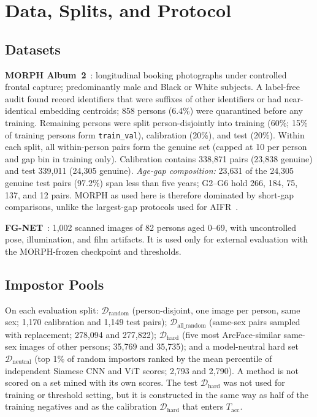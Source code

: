 \documentclass[journal]{IEEEtran}
\begin{document}


\section{Data, Splits, and Protocol}
\label{sec:protocol}

\subsection{Datasets}
\textbf{MORPH Album~2}~\cite{ricanek2006morph}: longitudinal booking photographs under controlled frontal capture; predominantly male and Black or White subjects. A label-free audit found record identifiers that were suffixes of other identifiers or had near-identical embedding centroids; 858 persons (6.4\%) were quarantined before any training. Remaining persons were split person-disjointly into training (60\%; 15\% of training persons form \texttt{train\_val}), calibration (20\%), and test (20\%). Within each split, all within-person pairs form the genuine set (capped at 10 per person and gap bin in training only). Calibration contains 338,871 pairs (23,838 genuine) and test 339,011 (24,305 genuine). \emph{Age-gap composition:} 23,631 of the 24,305 genuine test pairs (97.2\%) span less than five years; G2--G6 hold 266, 184, 75, 137, and 12 pairs. MORPH as used here is therefore dominated by short-gap comparisons, unlike the largest-gap protocols used for AIFR~\cite{zhao2022aim,wang2025ordcon}.

\textbf{FG-NET}~\cite{lanitis2002fgnet}: 1,002 scanned images of 82 persons aged 0--69, with uncontrolled pose, illumination, and film artifacts. It is used only for external evaluation with the MORPH-frozen checkpoint and thresholds.

\subsection{Impostor Pools}
On each evaluation split: $\mathcal{D}_{\text{random}}$ (person-disjoint, one image per person, same sex; 1,170 calibration and 1,149 test pairs); $\mathcal{D}_{\text{all\_random}}$ (same-sex pairs sampled with replacement; 278,094 and 277,822); $\mathcal{D}_{\text{hard}}$ (five most ArcFace-similar same-sex images of other persons; 35,769 and 35,735); and a model-neutral hard set $\mathcal{D}_{\text{neutral}}$ (top 1\% of random impostors ranked by the mean percentile of independent Siamese CNN and ViT scores; 2,793 and 2,790). A method is not scored on a set mined with its own scores. The test $\mathcal{D}_{\text{hard}}$ was not used for training or threshold setting, but it is constructed in the same way as half of the training negatives and as the calibration $\mathcal{D}_{\text{hard}}$ that enters $T_{\text{acc}}$.
\end{document}
